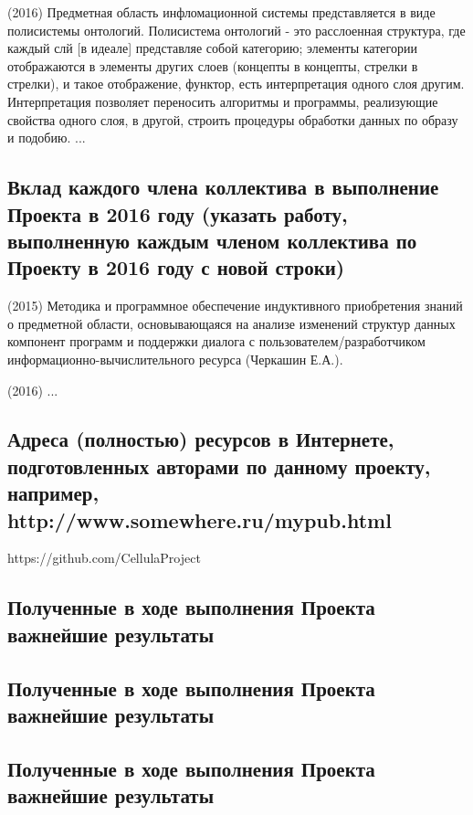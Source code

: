 \documentclass[12pt,a4paper]{ltxdoc}
\begin{document}
(2016) Предметная область инфломационной системы представляется в виде полисистемы онтологий. Полисистема онтологий - это расслоенная структура, где каждый слй [в идеале] представляе  собой  категорию;  элементы категории отображаются в элементы других слоев (концепты в концепты, стрелки в стрелки), и такое отображение, функтор, есть интерпретация одного слоя другим. Интерпретация позволяет переносить алгоритмы и программы, реализующие свойства одного слоя, в другой, строить процедуры обработки данных по образу и подобию. ...

\subsection{Вклад каждого члена коллектива в выполнение Проекта в 2016 году
  (указать работу, выполненную каждым членом коллектива по Проекту в 2016 году с
  новой строки)}
(2015) Методика и программное обеспечение индуктивного приобретения знаний о предметной области, основывающаяся на анализе изменений структур данных компонент программ и поддержки диалога с пользователем/разработчиком информационно-вычислительного ресурса (Черкашин Е.А.).

(2016) ...


\subsection{Адреса (полностью) ресурсов в Интернете, подготовленных авторами по
  данному проекту, например, http://www.somewhere.ru/mypub.html}

https://github.com/CellulaProject

\subsection{}
\subsection{Полученные в ходе выполнения Проекта важнейшие результаты}
\subsection{Полученные в ходе выполнения Проекта важнейшие результаты}
\subsection{Полученные в ходе выполнения Проекта важнейшие результаты}
\end{document}
